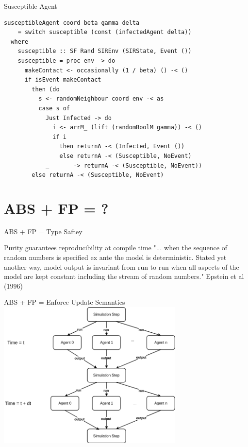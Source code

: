 \documentclass{beamer} %
\begin{document}
\begin{frame}[fragile]{Susceptible Agent}
\begin{block}{}
\begin{verbatim}
susceptibleAgent coord beta gamma delta 
    = switch susceptible (const (infectedAgent delta))
  where
    susceptible :: SF Rand SIREnv (SIRState, Event ())
    susceptible = proc env -> do
      makeContact <- occasionally (1 / beta) () -< ()
      if isEvent makeContact
        then (do
          s <- randomNeighbour coord env -< as
          case s of
            Just Infected -> do
              i <- arrM_ (lift (randomBoolM gamma)) -< ()
              if i
                then returnA -< (Infected, Event ())
                else returnA -< (Susceptible, NoEvent)
            _       -> returnA -< (Susceptible, NoEvent))
        else returnA -< (Susceptible, NoEvent)
\end{verbatim}
\end{block}
\end{frame}

\section{ABS + FP = ?}
\begin{frame}{ABS + FP = Type Saftey}
	\begin{block}{Purity guarantees reproducibility at compile time}
    "... when the sequence of random numbers is specified ex ante the model is deterministic. Stated yet another way, model output is invariant from run to run when all aspects of the model are kept constant including the stream of random numbers." Epstein et al (1996)
    \end{block}
\end{frame}

\begin{frame}{ABS + FP = Enforce Update Semantics}
  \includegraphics[width=0.7\textwidth]{./fig/parallel_strategy.png}
\end{frame}
\end{document}
